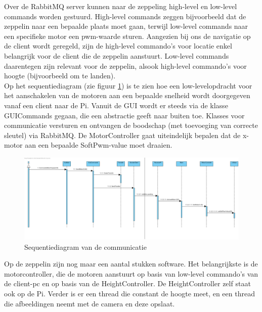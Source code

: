 \documentclass[eind]{penoverslag}
\begin{document}
Over de RabbitMQ server kunnen naar de zeppeling high-level en low-level commands worden gestuurd. High-level commands zeggen bijvoorbeeld dat de zeppelin naar een bepaalde plaats moet gaan, terwijl low-level commands naar een specifieke motor een pwm-waarde sturen. Aangezien bij ons de navigatie op de client wordt geregeld, zijn de high-level commando's voor locatie enkel belangrijk voor de client die de zeppelin aanstuurt. Low-level commands daarentegen zijn relevant voor de zeppelin, alsook high-level commando's voor hoogte (bijvoorbeeld om te landen). \\

Op het sequentiediagram (zie figuur \ref{Sequence}) is te zien hoe een low-levelopdracht voor het aanschakelen van de motoren aan een bepaalde snelheid wordt doorgegeven vanaf een client naar de Pi. Vanuit de GUI wordt er steeds via de klasse GUICommands gegaan, die een abstractie geeft naar buiten toe. Klasses voor communicatie versturen en ontvangen de boodschap (met toevoeging van correcte sleutel) via RabbitMQ. De MotorController gaat uiteindelijk bepalen dat de x-motor aan een bepaalde SoftPwm-value moet draaien.
\\

\begin{figure}[H]
\begin{center}
\includegraphics[width=1\textwidth]{PiToClientCommunication.png}
\end{center}
\caption{Sequentiediagram van de communicatie}
\label{Sequence}
\end{figure}

Op de zeppelin zijn nog maar een aantal stukken software. Het belangrijkste is de motorcontroller, die de motoren aanstuurt op basis van low-level commando's van de client-pc en op basis van de HeightController. De HeightController zelf staat ook op de Pi. Verder is er een thread die constant de hoogte meet, en een thread die afbeeldingen neemt met de camera en deze opslaat. \\
\end{document}
